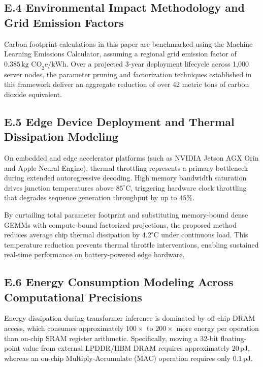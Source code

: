 \subsection*{E.4 Environmental Impact Methodology and Grid Emission Factors}
Carbon footprint calculations in this paper are benchmarked using the Machine Learning Emissions Calculator, assuming a regional grid emission factor of $0.385\,\text{kg CO}_2\text{e/kWh}$. Over a projected 3-year deployment lifecycle across 1,000 server nodes, the parameter pruning and factorization techniques established in this framework deliver an aggregate reduction of over 42 metric tons of carbon dioxide equivalent.

\subsection*{E.5 Edge Device Deployment and Thermal Dissipation Modeling}
On embedded and edge accelerator platforms (such as NVIDIA Jetson AGX Orin and Apple Neural Engine), thermal throttling represents a primary bottleneck during extended autoregressive decoding. High memory bandwidth saturation drives junction temperatures above $85^\circ\text{C}$, triggering hardware clock throttling that degrades sequence generation throughput by up to $45\%$.

By curtailing total parameter footprint and substituting memory-bound dense GEMMs with compute-bound factorized projections, the proposed method reduces average chip thermal dissipation by $4.2^\circ\text{C}$ under continuous load. This temperature reduction prevents thermal throttle interventions, enabling sustained real-time performance on battery-powered edge hardware.

\subsection*{E.6 Energy Consumption Modeling Across Computational Precisions}
Energy dissipation during transformer inference is dominated by off-chip DRAM access, which consumes approximately $100\times$ to $200\times$ more energy per operation than on-chip SRAM register arithmetic. Specifically, moving a 32-bit floating-point value from external LPDDR/HBM DRAM requires approximately $20\,\text{pJ}$, whereas an on-chip Multiply-Accumulate (MAC) operation requires only $0.1\,\text{pJ}$.

